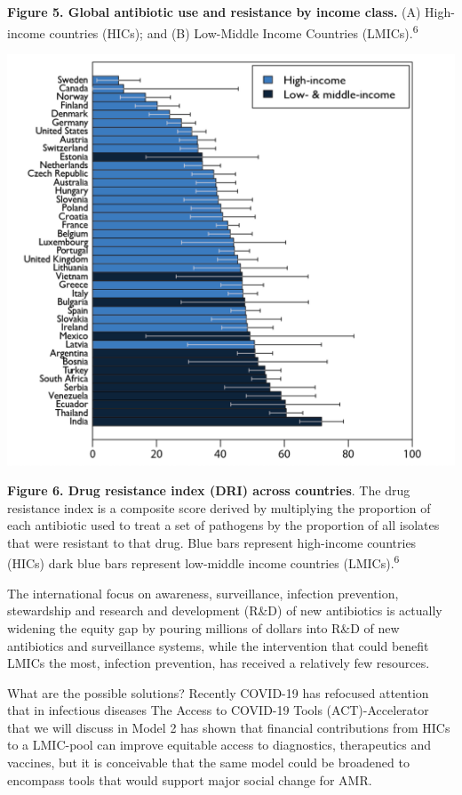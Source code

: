 \documentclass[
]{book}
\begin{document}
\textbf{Figure 5. Global antibiotic use and resistance by income class.} (A) High-income countries (HICs); and (B) Low-Middle Income Countries (LMICs).\textsuperscript{6}

\includegraphics[width=8.33333in,height=\textheight]{images/DRI.png}

\textbf{Figure 6. Drug resistance index (DRI) across countries}. The drug resistance index is a composite score derived by multiplying the proportion of each antibiotic used to treat a set of pathogens by the proportion of all isolates that were resistant to that drug. Blue bars represent high-income countries (HICs) dark blue bars represent low-middle income countries (LMICs).\textsuperscript{6}

The international focus on awareness, surveillance, infection prevention, stewardship and research and development (R\&D) of new antibiotics is actually widening the equity gap by pouring millions of dollars into R\&D of new antibiotics and surveillance systems, while the intervention that could benefit LMICs the most, infection prevention, has received a relatively few resources.

What are the possible solutions? Recently COVID-19 has refocused attention that in infectious diseases The Access to COVID-19 Tools (ACT)-Accelerator that we will discuss in Model 2 has shown that financial contributions from HICs to a LMIC-pool can improve equitable access to diagnostics, therapeutics and vaccines, but it is conceivable that the same model could be broadened to encompass tools that would support major social change for AMR.
\end{document}
